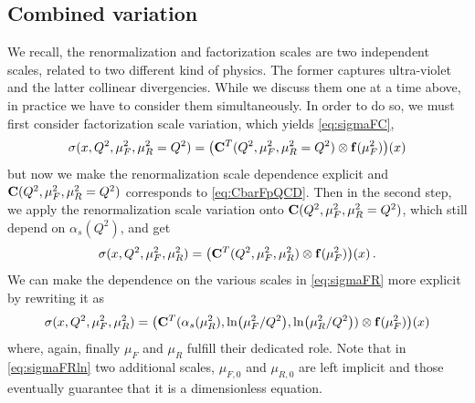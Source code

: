 \subsection{Combined variation}
\label{sec:svcomb}
We recall, the renormalization and factorization scales are two independent scales, related to two different kind of physics.
The former captures ultra-violet and the latter collinear divergencies.
While we discuss them one at a time above, in practice we have to consider them simultaneously.
In order to do so, we must first consider factorization scale variation, which yields \cref{eq:sigmaFC},
\begin{equation}
    \sigma(x,Q^2,\mu_F^2,\mu_R^2=Q^2) = \qty(\vb C^T(Q^2,\mu_F^2,\mu_R^2=Q^2) \otimes \vb f(\mu_F^2))(x)
\end{equation}
but now we make the renormalization scale dependence explicit and $\vb C(Q^2,\mu_F^2,\mu_R^2=Q^2)$ corresponds to \cref{eq:CbarFpQCD}.
Then in the second step, we apply the renormalization scale variation onto $\vb C(Q^2,\mu_F^2,\mu_R^2=Q^2)$, which still depend on $\alpha_s(Q^2)$, and get
\begin{equation}
    \sigma(x,Q^2,\mu_F^2,\mu_R^2) = \qty(\vb C^T(Q^2,\mu_F^2,\mu_R^2) \otimes \vb f(\mu_F^2))(x)\,. \label{eq:sigmaFR}
\end{equation}
We can make the dependence on the various scales in \cref{eq:sigmaFR} more explicit by rewriting it as
\begin{equation}
    \sigma(x,Q^2,\mu_F^2,\mu_R^2) = \qty(\vb C^T(\alpha_s(\mu_R^2),\ln(\mu_F^2/Q^2),\ln(\mu_R^2/Q^2)) \otimes \vb f(\mu_F^2))(x) \label{eq:sigmaFRln}
\end{equation}
where, again, finally $\mu_F$ and $\mu_R$ fulfill their dedicated role.
Note that in \cref{eq:sigmaFRln} two additional scales, $\mu_{F,0}$ and $\mu_{R,0}$ are left implicit and those eventually guarantee that it is a dimensionless equation.

